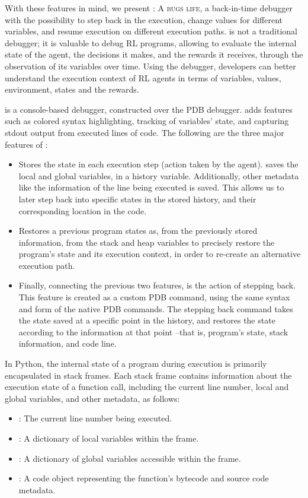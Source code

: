 With these features in mind, we present \flik: \textsc{A bugs life}, a back-in-time debugger with the 
possibility to step back in the execution, change values for different variables, and resume execution 
on different execution paths. \flik is not a traditional debugger; it is valuable to debug \ac{RL} 
programs, allowing to evaluate the internal state of the agent, the decisions it makes, and the rewards 
it receives, through the observation of its variables over time. Using the debugger, developers can 
better understand the execution context of \ac{RL} agents in terms of variables, values, environment, 
states and the rewards. 

\flik is a console-based debugger, constructed over the \ac{PDB} debugger. \flik adds features 
such as colored syntax highlighting, tracking of variables' state, and capturing stdout output 
from executed lines of code. The following are the three major features of \flik:
\begin{itemize}
    \item Stores the state in each execution step (\ie action taken by the agent). \flik saves the local 
    and global variables, in a history variable. Additionally, other metadata like the information of the 
    line being executed is saved. This allows us to later step back into specific states in the stored 
    history, and their corresponding location in the code. 
    \item Restores a previous program states as, from the previously stored information, from the 
    stack and heap variables to precisely restore the program's state and its execution context, in 
    order to re-create an alternative execution path. 
    \item Finally, connecting the previous two features, is the action of stepping back. This feature is 
    created as a custom \ac{PDB} command, using the same syntax and form of the native \ac{PDB} 
    commands. The stepping back command takes the state saved at a specific point in the history, 
    and restores the state according to the information at that point --that is, program's state, stack 
    information, and code line. 
\end{itemize}

In Python, the internal state of a program during execution is primarily encapsulated in 
stack frames. Each stack frame contains information about the execution state of a function 
call, including the current line number, local and global variables, and other metadata, as follows:
\begin{itemize}
    \item {}: The current line number being executed.
    \item {}: A dictionary of local variables within the frame.
    \item {}: A dictionary of global variables accessible within the frame.
    \item {}: A code object representing the function's bytecode and source code metadata.
\end{itemize}

